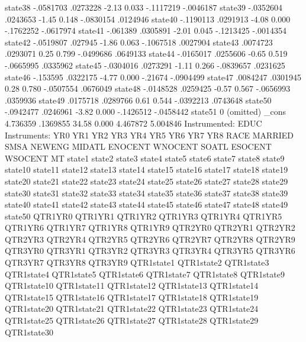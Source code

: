      state38 {\VBAR}  -.0581703   .0273228    -2.13   0.033    -.1117219   -.0046187
     state39 {\VBAR}  -.0352604   .0243653    -1.45   0.148    -.0830154    .0124946
     state40 {\VBAR}  -.1190113   .0291913    -4.08   0.000    -.1762252   -.0617974
     state41 {\VBAR}   -.061389   .0305891    -2.01   0.045    -.1213425   -.0014354
     state42 {\VBAR}  -.0519807    .027945    -1.86   0.063    -.1067518    .0027904
     state43 {\VBAR}   .0074723   .0293071     0.25   0.799    -.0499686    .0649133
     state44 {\VBAR}  -.0165017   .0255606    -0.65   0.519    -.0665995    .0335962
     state45 {\VBAR}  -.0304016   .0273291    -1.11   0.266    -.0839657    .0231625
     state46 {\VBAR}   -.153595   .0322175    -4.77   0.000      -.21674   -.0904499
     state47 {\VBAR}   .0084247   .0301945     0.28   0.780    -.0507554    .0676049
     state48 {\VBAR}  -.0148528   .0259425    -0.57   0.567    -.0656993    .0359936
     state49 {\VBAR}   .0175718   .0289766     0.61   0.544    -.0392213    .0743648
     state50 {\VBAR}  -.0942477   .0246961    -3.82   0.000    -.1426512   -.0458442
     state51 {\VBAR}          0  (omitted)
       _cons {\VBAR}   4.736359   .1369855    34.58   0.000     4.467872    5.004846
Instrumented:  EDUC
Instruments:   YR0 YR1 YR2 YR3 YR4 YR5 YR6 YR7 YR8 RACE MARRIED SMSA NEWENG
               MIDATL ENOCENT WNOCENT SOATL ESOCENT WSOCENT MT state1 state2
               state3 state4 state5 state6 state7 state8 state9 state10
               state11 state12 state13 state14 state15 state16 state17
               state18 state19 state20 state21 state22 state23 state24
               state25 state26 state27 state28 state29 state30 state31
               state32 state33 state34 state35 state36 state37 state38
               state39 state40 state41 state42 state43 state44 state45
               state46 state47 state48 state49 state50 QTR1YR0 QTR1YR1
               QTR1YR2 QTR1YR3 QTR1YR4 QTR1YR5 QTR1YR6 QTR1YR7 QTR1YR8
               QTR1YR9 QTR2YR0 QTR2YR1 QTR2YR2 QTR2YR3 QTR2YR4 QTR2YR5
               QTR2YR6 QTR2YR7 QTR2YR8 QTR2YR9 QTR3YR0 QTR3YR1 QTR3YR2
               QTR3YR3 QTR3YR4 QTR3YR5 QTR3YR6 QTR3YR7 QTR3YR8 QTR3YR9
               QTR1state1 QTR1state2 QTR1state3 QTR1state4 QTR1state5
               QTR1state6 QTR1state7 QTR1state8 QTR1state9 QTR1state10
               QTR1state11 QTR1state12 QTR1state13 QTR1state14 QTR1state15
               QTR1state16 QTR1state17 QTR1state18 QTR1state19 QTR1state20
               QTR1state21 QTR1state22 QTR1state23 QTR1state24 QTR1state25
               QTR1state26 QTR1state27 QTR1state28 QTR1state29 QTR1state30

